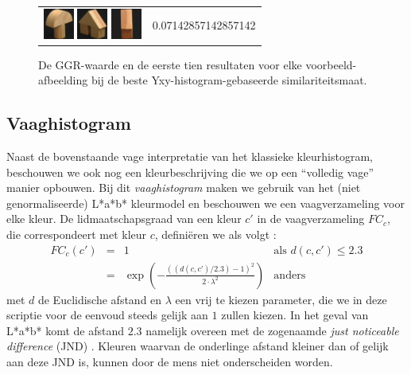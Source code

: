 \begin{figure}[tbp]
\begin{center}
\begin{tabular}{m{11cm} | m{3cm} |}
\includegraphics[width=1cm]{coil/beeld-3.eps}
\includegraphics[width=1cm]{coil/beeld-46.eps}
\includegraphics[width=1cm]{coil/beeld-44.eps}
& {\scriptsize 0.07142857142857142}
\end{tabular}
\caption{\label{fig:results_yxy_histgeb}De GGR-waarde en de eerste tien resultaten voor elke voorbeeld-afbeelding bij de beste Yxy-histogram-gebaseerde similariteitsmaat.}
\end{center}
\end{figure}




\subsection{Vaaghistogram}

Naast de bovenstaande vage interpretatie van het klassieke kleurhistogram, beschouwen we
ook nog een kleurbeschrijving die we op een ``volledig vage'' manier opbouwen. Bij dit
\emph{vaaghistogram} maken we gebruik van het (niet genormaliseerde) L*a*b* kleurmodel en 
beschouwen we een vaagverzameling voor elke kleur. 
De lidmaatschapsgraad van een kleur $c'$ in de vaagverzameling 
$FC_c$, die correspondeert met kleur $c$, defini\"eren we als volgt \cite{vertan:fuzzy_histograms}: 
$$
\begin{array}{rcll}
FC_c(c') & = & 1 & \textrm{als } d(c,c') \leq 2.3 \\
		 & = & \exp \left( - \frac{\left((d(c,c') / 2.3) - 1\right)^2}{2 \cdot \lambda^2} \right) & \textrm{anders}
\end{array}
$$  
met $d$ de Euclidische afstand en $\lambda$ een vrij te kiezen parameter, die we in deze scriptie
voor de eenvoud steeds gelijk aan $1$ zullen kiezen. In het geval van L*a*b* 
komt de afstand $2.3$ namelijk overeen met de zogenaamde \emph{just noticeable difference} (JND)
\cite{sharma:digital_color_imaging}. 
Kleuren waarvan de onderlinge afstand kleiner dan of gelijk aan deze JND is, kunnen door de mens 
niet onderscheiden worden.

